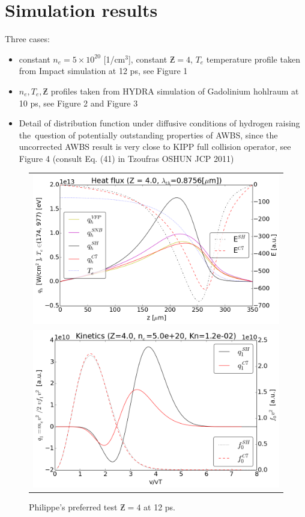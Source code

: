 \section{Simulation results}\label{sec:results}
Three cases:
\begin{itemize}
  \item constant $n_e = 5\times10^{20}$ [1/cm$^3$], constant $\Zbar = 4$, 
  $T_e$ temperature profile taken from Impact simulation at 12 ps, see Figure 1
  \item $n_e, T_e, \Zbar$ profiles taken from HYDRA simulation of Gadolinium
  hohlraum at 10 ps, see Figure 2 and Figure 3
  \item Detail of distribution function under diffusive conditions of hydrogen 
  raising the~question of potentially outstanding properties of AWBS, since
  the uncorrected AWBS result is very close to KIPP full collision operator,
  see Figure 4 (consult Eq. (41) in Tzoufras OSHUN JCP 2011) 
\end{itemize}
\begin{figure}[tbh]
  \begin{center}
    \begin{tabular}{c}
      \includegraphics[width=1.0\textwidth]{../VFPdata/C7_heatflux_12ps.png} \\ 
      \includegraphics[width=1.0\textwidth]{../VFPdata/C7_kinetics_12ps.png}
    \end{tabular}
  \caption{
  Philippe's preferred test $\Zbar = 4$ at 12 ps.  
  }
  \end{center}
  \label{fig:Philippe_VFP_12ps}
\end{figure}

